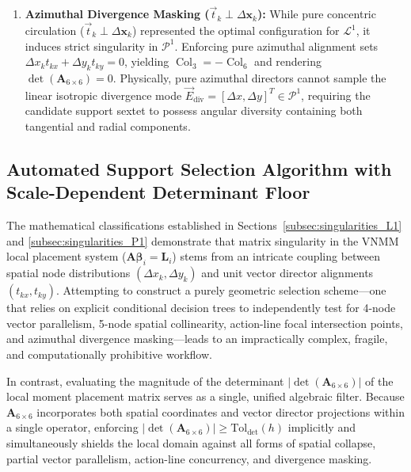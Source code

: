 \documentclass[preprint,12pt]{elsarticle}
\begin{document}
\begin{enumerate}
    \item \textbf{Azimuthal Divergence Masking ($\vec{t}_k \perp \Delta \mathbf{x}_k$):} While pure concentric circulation ($\vec{t}_k \perp \Delta \mathbf{x}_k$) represented the optimal configuration for $\mathcal{L}^1$, it induces strict singularity in $\mathcal{P}^1$. Enforcing pure azimuthal alignment sets $\Delta x_k t_{kx} + \Delta y_k t_{ky} = 0$, yielding $\operatorname{Col}_3 = -\operatorname{Col}_6$ and rendering $\det(\mathbf{A}_{6 \times 6}) = 0$. Physically, pure azimuthal directors cannot sample the linear isotropic divergence mode $\vec{E}_{\mathrm{div}} = [\Delta x, \Delta y]^T \in \mathcal{P}^1$, requiring the candidate support sextet to possess angular diversity containing both tangential and radial components.
\end{enumerate}


\subsection{Automated Support Selection Algorithm with Scale-Dependent Determinant Floor}
\label{sec:support_selection_algorithm}

The mathematical classifications established in Sections~\ref{subsec:singularities_L1} and \ref{subsec:singularities_P1} demonstrate that matrix singularity in the VNMM local placement system ($\mathbf{A} \boldsymbol{\beta}_i = \mathbf{L}_i$) stems from an intricate coupling between spatial node distributions $(\Delta x_k, \Delta y_k)$ and unit vector director alignments $(t_{kx}, t_{ky})$. Attempting to construct a purely geometric selection scheme---one that relies on explicit conditional decision trees to independently test for 4-node vector parallelism, 5-node spatial collinearity, action-line focal intersection points, and azimuthal divergence masking---leads to an impractically complex, fragile, and computationally prohibitive workflow.

In contrast, evaluating the magnitude of the determinant $|\det(\mathbf{A}_{6\times6})|$ of the local moment placement matrix serves as a single, unified algebraic filter. Because $\mathbf{A}_{6\times6}$ incorporates both spatial coordinates and vector director projections within a single operator, enforcing $|\det(\mathbf{A}_{6\times6})| \ge \mathrm{Tol}_{\mathrm{det}}(h)$ implicitly and simultaneously shields the local domain against all forms of spatial collapse, partial vector parallelism, action-line concurrency, and divergence masking.
\end{document}
